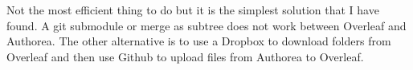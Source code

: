 Not the most efficient thing to do but it is the simplest solution that I have found. A git submodule or merge as subtree does not work between Overleaf and Authorea. The other alternative is to use a Dropbox to download folders from Overleaf and then use Github to upload files from Authorea to Overleaf. 

